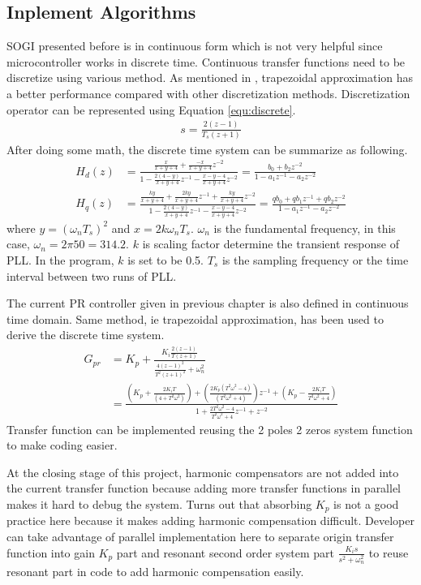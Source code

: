 \subsection{Inplement Algorithms}
\gls{SOGI} presented before is in continuous form which is not very helpful since microcontroller works in discrete time. Continuous transfer functions need to be discretize using various method. As mentioned in \cite{RN21}, trapezoidal approximation has a better performance compared with other discretization methods. Discretization operator can be represented using Equation \ref{equ:discrete}.
\begin{align}\label{equ:discrete}
    s = \frac{2(z-1)}{T_s(z+1)}
\end{align}
After doing some math, the discrete time system can be summarize as following. 
\begin{align}
    H_d(z) &= \frac{\frac{x}{x+y+4}+\frac{-x}{x+y+4}z^{-2}}{1 - \frac{2(4-y)}{x+y+4}z^{-1} - \frac{x-y-4}{x+y+4}z^{-2}} = \frac{b_0+b_2z^{-2}}{1-a_1z^{-1}-a_2z^{-2}}\\
    H_q(z) &= \frac{\frac{ky}{x+y+4}+\frac{2ky}{x+y+4}z^{-1}+\frac{ky}{x+y+4}z^{-2}}{1-\frac{2(4-y)}{x+y+4}z^{-1}-\frac{x-y-4}{x+y+4}z^{-2}} = \frac{qb_0+qb_1z^{-1}+qb_2z^{-2}}{1-a_1z^{-1}-a_2z^{-2}}
\end{align} 
where $y= (\omega_nT_s)^2$ and $x=2k\omega_nT_s$. $\omega_n$ is the fundamental frequency, in this case, $\omega_n=2\pi 50=314.2$. $k$ is scaling factor determine the transient response of \gls{PLL}. In the program, $k$ is set to be 0.5. $T_s$ is the sampling frequency or the time interval between two runs of \gls{PLL}.

The current PR controller given in previous chapter is also defined in continuous time domain. Same method, ie trapezoidal approximation, has been used to derive the discrete time system.
\begin{align}
    G_{pr} &= K_p+\frac{K_i\frac{2(z-1)}{T(z+1)}}{\frac{4(z-1)^2}{T^2(z+1)^2}+\omega_n^2}\\
         &= \frac{(K_p+\frac{2K_iT}{(4+T^2\omega^2)})+(\frac{2K_p(T^2\omega^2-4)}{(T^2\omega^2+4)})z^{-1}+(K_p-\frac{2K_iT}{T^2\omega^2+4})}{1+\frac{2T^2\omega^2-4}{T^2\omega^2+4}z^{-1}+z^{-2}}
\end{align}
Transfer function can be implemented reusing the 2 poles 2 zeros system function to make coding easier. 

At the closing stage of this project, harmonic compensators are not added into the current transfer function because adding more transfer functions in parallel makes it hard to debug the system. Turns out that absorbing $K_p$ is not a good practice here because it makes adding harmonic compensation difficult. Developer can take advantage of parallel implementation here to separate origin transfer function into gain $K_p$ part and resonant second order system part $\frac{K_is}{s^2+\omega_n^2}$ to reuse resonant part in code to add harmonic compensation easily. 
